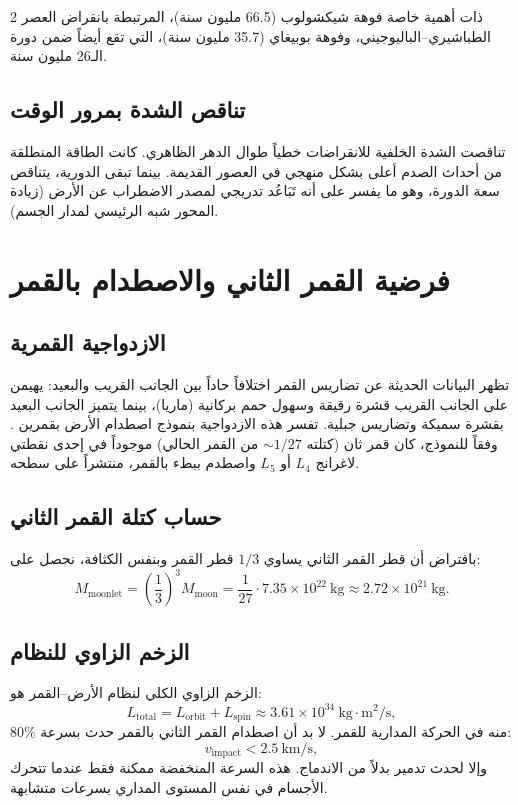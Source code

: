 \documentclass[11pt,a4paper]{article}
\begin{document}
\begin{multicols}{2}
		ذات أهمية خاصة فوهة شيكشولوب (66.5 مليون سنة)، المرتبطة بانقراض العصر الطباشيري–الباليوجيني، وفوهة بوبيغاي (35.7 مليون سنة)، التي تقع أيضاً ضمن دورة الـ26 مليون سنة.
		
		\subsection{تناقص الشدة بمرور الوقت}
		تناقصت الشدة الخلفية للانقراضات خطياً طوال الدهر الظاهري. كانت الطاقة المنطلقة من أحداث الصدم أعلى بشكل منهجي في العصور القديمة. بينما تبقى الدورية، يتناقص سعة الدورة، وهو ما يفسر على أنه تَبَاعُد تدريجي لمصدر الاضطراب عن الأرض (زيادة المحور شبه الرئيسي لمدار الجسم).
		
		\section{فرضية القمر الثاني والاصطدام بالقمر}
		\subsection{الازدواجية القمرية}
		تظهر البيانات الحديثة عن تضاريس القمر اختلافاً حاداً بين الجانب القريب والبعيد: يهيمن على الجانب القريب قشرة رقيقة وسهول حمم بركانية (ماريا)، بينما يتميز الجانب البعيد بقشرة سميكة وتضاريس جبلية. تفسر هذه الازدواجية بنموذج اصطدام الأرض بقمرين \cite{JutziAsphaug2011}. وفقاً للنموذج، كان قمر ثان (كتلته \(\sim 1/27\) من القمر الحالي) موجوداً في إحدى نقطتي لاغرانج \(L_4\) أو \(L_5\) واصطدم ببطء بالقمر، منتشراً على سطحه.
		
		\subsection{حساب كتلة القمر الثاني}
		بافتراض أن قطر القمر الثاني يساوي \(1/3\) قطر القمر وبنفس الكثافة، نحصل على:
		{\small
			\[
			M_{\text{moonlet}} = \left(\frac{1}{3}\right)^3 M_{\text{moon}} = \frac{1}{27} \cdot 7.35 \times 10^{22}\ \text{kg} \approx 2.72 \times 10^{21}\ \text{kg}.
			\]}
		
		\subsection{الزخم الزاوي للنظام}
		الزخم الزاوي الكلي لنظام الأرض–القمر هو:
		\[
		L_{\text{total}} = L_{\text{orbit}} + L_{\text{spin}} \approx 3.61 \times 10^{34}\ \text{kg}\cdot\text{m}^2/\text{s},
		\]
		80\% منه في الحركة المدارية للقمر. لا بد أن اصطدام القمر الثاني بالقمر حدث بسرعة:
		\[
		v_{\text{impact}} < 2.5\ \text{km/s},
		\]
		وإلا لحدث تدمير بدلاً من الاندماج. هذه السرعة المنخفضة ممكنة فقط عندما تتحرك الأجسام في نفس المستوى المداري بسرعات متشابهة.
		

\end{multicols}
\end{document}
